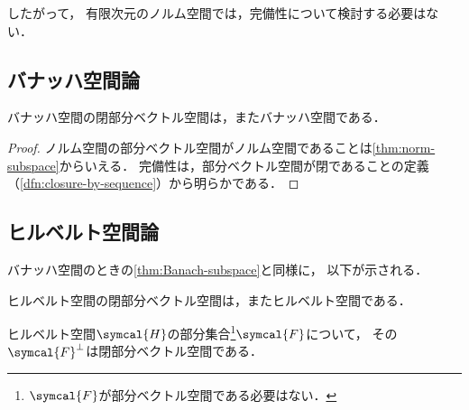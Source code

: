 \documentclass[../sotsu.tex]{subfiles}
\begin{document}
したがって，
有限次元のノルム空間では，完備性について検討する必要はない．



\subsection{バナッハ空間論}

\begin{proposition}
    \label{thm:Banach-subspace}
    バナッハ空間の閉部分ベクトル空間は，またバナッハ空間である．
\end{proposition}

\begin{proof}
    ノルム空間の部分ベクトル空間がノルム空間であることは\cref{thm:norm-subspace}からいえる．
    完備性は，部分ベクトル空間が閉であることの定義（\cref{dfn:closure-by-sequence}）から明らかである．
\end{proof}



\subsection{ヒルベルト空間論}

バナッハ空間のときの\cref{thm:Banach-subspace}と同様に，
以下が示される．

\begin{corollary}
    \label{thm:Hilbert-subspace}
    ヒルベルト空間の閉部分ベクトル空間は，またヒルベルト空間である．
\end{corollary}


\begin{proposition}
    \label{thm:Hilbert-subspace-orthogonal-compliment}
    ヒルベルト空間$\symcal{H}$の部分集合\footnote{
        $\symcal{F}$が部分ベクトル空間である必要はない．
    }$\symcal{F}$について，
    その$\symcal{F}^\perp$は閉部分ベクトル空間である．
\end{proposition}
\end{document}

